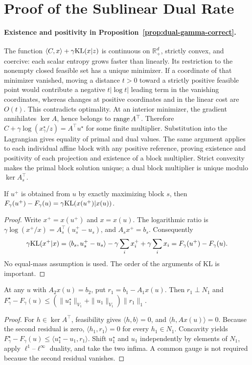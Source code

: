 \section{Proof of the Sublinear Dual Rate}\label{app-app:dual-rate-proofs}
\paragraph{Existence and positivity in Proposition~\ref{prop:dual-gamma-correct}.}
The function $\langle C,x\rangle+\gamma\mathrm{KL}(x|z)$ is continuous on $\mathbb R_+^d$, strictly convex, and coercive: each scalar entropy grows faster than linearly. Its restriction to the nonempty closed feasible set has a unique minimizer. If a coordinate of that minimizer vanished, moving a distance $t>0$ toward a strictly positive feasible point would contribute a negative $t|\log t|$ leading term in the vanishing coordinates, whereas changes at positive coordinates and in the linear cost are $O(t)$. This contradicts optimality. At an interior minimizer, the gradient annihilates $\ker A$, hence belongs to $\operatorname{range} A^\top$. Therefore $C+\gamma\log(x_\gamma^\star/z)=A^\top u^\star$ for some finite multiplier. Substitution into the Lagrangian gives equality of primal and dual values. The same argument applies to each individual affine block with any positive reference, proving existence and positivity of each projection and existence of a block multiplier. Strict convexity makes the primal block solution unique; a dual block multiplier is unique modulo $\ker A_s^\top$.

\begin{lemma}\label{app-lem:per-step-ascent}
If $u^+$ is obtained from $u$ by exactly maximizing block $s$, then
$F_\gamma(u^+)-F_\gamma(u)=\gamma\mathrm{KL}(x(u^+)|x(u))$.
\end{lemma}
\begin{proof}
Write $x^+=x(u^+)$ and $x=x(u)$. The logarithmic ratio is $\gamma\log(x^+/x)=A_s^\top(u_s^+-u_s)$, and $A_sx^+=b_s$. Consequently
\[
\gamma\mathrm{KL}(x^+|x)=\langle b_s,u_s^+-u_s\rangle
-\gamma\sum_i x_i^++\gamma\sum_i x_i
=F_\gamma(u^+)-F_\gamma(u).
\]
No equal-mass assumption is used. The order of the arguments of KL is important.
\end{proof}

\begin{lemma}\label{app-lem:gap-vs-res-quotient}
At any $u$ with $A_2x(u)=b_2$, put $r_1=b_1-A_1x(u)$. Then $r_1\perp N_1$ and
$F_\gamma^\star-F_\gamma(u)\leq(\|u_1^\star\|_{V_1}+\|u_1\|_{V_1})\|r_1\|_1$.
\end{lemma}
\begin{proof}
For $h\in\ker A^\top$, feasibility gives $\langle h,b\rangle=0$, and $\langle h,Ax(u)\rangle=0$. Because the second residual is zero, $\langle h_1,r_1\rangle=0$ for every $h_1\in N_1$. Concavity yields $F_\gamma^\star-F_\gamma(u)\leq\langle u_1^\star-u_1,r_1\rangle$. Shift $u_1^\star$ and $u_1$ independently by elements of $N_1$, apply $\ell^1$--$\ell^\infty$ duality, and take the two infima. A common gauge is not required because the second residual vanishes.
\end{proof}

